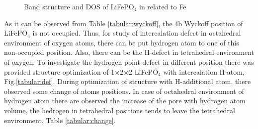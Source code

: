\documentclass[11pt]{article}
\begin{document}
\begin{figure}[H]
\begin{minipage}[h]{1\linewidth}
\end{minipage}
\caption{Band structure and DOS of LiFePO$_4$ in related to Fe}
\label{dos}
\end{figure}

As it can be observed from Table \ref{tabular:wyckoff}, the 4b Wyckoff position of LiFePO$_4$ is not occupied. Thus, for study of intercalation defect in octahedral environment of oxygen atoms, there can be put hydrogen atom to one of this non-occupied position. Also, there can be the H-defect in tetrahedral environment of oxygen. To investigate the hydrogen point defect in different position there was provided structure optimization of 1$\times$2$\times$2 LiFePO$_4$ with intercalation H-atom, Fig.\ref{tabular:def}. During optimization of structure with H-additional atom, there observed some change of atoms positions. In case of octahedral environment of hydrogen atom there are observed the increase of the pore with hydrogen atom volume, the hedrogen in tetrahedral positions tends to leave the tetrahedral environment, Table \ref{tabular:change}.
\end{document}
